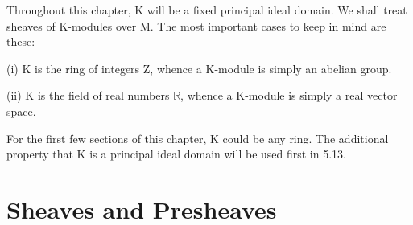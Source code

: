 Throughout this chapter, K will be a fixed principal ideal domain. We shall treat sheaves of K-modules over M. The most important cases to keep in mind are these: 

(i) K is the ring of integers Z, whence a K-module is simply an abelian group.

(ii) K is the field of real numbers  $ \mathbb{R} $, whence a K-module is simply a real vector space.

For the first few sections of this chapter, K could be any ring. The additional property that K is a principal ideal domain will be used first in 5.13.

\section{Sheaves and Presheaves}


